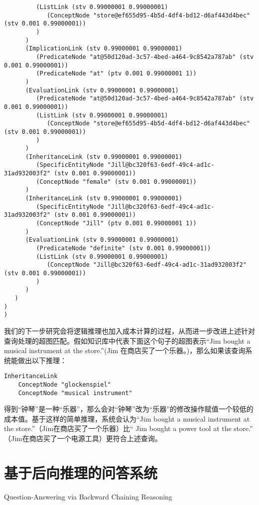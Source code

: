 {\begin{tiny}
\begin{lstlisting}
         (ListLink (stv 0.99000001 0.99000001)
            (ConceptNode "store@ef655d95-4b5d-4df4-bd12-d6af443d4bec" (stv 0.001 0.99000001))
         )
      )
      (ImplicationLink (stv 0.99000001 0.99000001)
         (PredicateNode "at@50d120ad-3c57-4bed-a464-9c8542a787ab" (stv 0.001 0.99000001))
         (PredicateNode "at" (ptv 0.001 0.99000001 1))
      )
      (EvaluationLink (stv 0.99000001 0.99000001)
         (PredicateNode "at@50d120ad-3c57-4bed-a464-9c8542a787ab" (stv 0.001 0.99000001))
         (ListLink (stv 0.99000001 0.99000001)
            (ConceptNode "store@ef655d95-4b5d-4df4-bd12-d6af443d4bec" (stv 0.001 0.99000001))
         )
      )
      (InheritanceLink (stv 0.99000001 0.99000001)
         (SpecificEntityNode "Jill@bc320f63-6edf-49c4-ad1c-31ad932003f2" (stv 0.001 0.99000001))
         (ConceptNode "female" (stv 0.001 0.99000001))
      )
      (InheritanceLink (stv 0.99000001 0.99000001)
         (SpecificEntityNode "Jill@bc320f63-6edf-49c4-ad1c-31ad932003f2" (stv 0.001 0.99000001))
         (ConceptNode "Jill" (ptv 0.001 0.99000001 1))
      )
      (EvaluationLink (stv 0.99000001 0.99000001)
         (PredicateNode "definite" (stv 0.001 0.99000001))
         (ListLink (stv 0.99000001 0.99000001)
            (ConceptNode "Jill@bc320f63-6edf-49c4-ad1c-31ad932003f2" (stv 0.001 0.99000001))
         )
      )
   )
)
)

\end{lstlisting}\end{tiny}}

我们的下一步研究会将逻辑推理也加入成本计算的过程，从而进一步改进上述针对查询处理的超图匹配。假如知识库中代表下面这个句子的超图表示“Jim bought a musical instrument at the store.”(Jim 在商店买了一个乐器。)，那么如果该查询系统能做出以下推理：

\begin{verbatim}
InheritanceLink
	ConceptNode "glockenspiel"
	ConceptNode "musical instrument"
\end{verbatim}

得到“钟琴”是一种“乐器”，那么会对“钟琴”改为“乐器”的修改操作赋值一个较低的成本值。基于这样的简单推理，系统会认为“Jim bought a musical instrument at the store.”（Jim在商店买了一个乐器）比“ Jim bought a power tool at the store.” （Jim在商店买了一个电源工具）更符合上述查询。

\section{基于后向推理的问答系统}{Question-Answering via Backward Chaining Reasoning}


